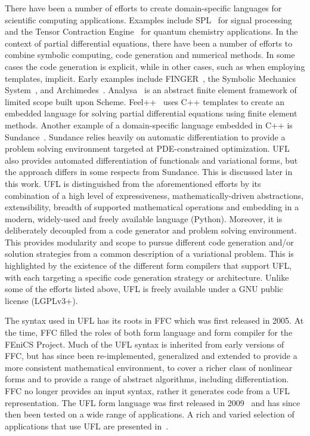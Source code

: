 \documentclass[prodmode,acmtoms]{acmsmall}
\begin{document}
There have been a number of efforts to create domain-specific
languages for scientific computing applications. Examples include
SPL~\citep{xiong:2001} for signal processing and the Tensor
Contraction Engine~\citep{baumgartner:2005} for quantum chemistry
applications.  In the context of partial differential equations, there
have been a number of efforts to combine symbolic computing, code
generation and numerical methods. In some cases the code generation is
explicit, while in other cases, such as when employing templates,
implicit. Early examples include FINGER~\citep{wang:1986}, the
Symbolic Mechanics System~\citep{korelc:1997}, and
Archimedes~\citep{ShewchukGhattas1993}. Analysa~\citep{bagheri:2004}
is an abstract finite element framework of limited scope built upon
Scheme.  Feel++~\citep{prudhomme:www,prudhomme:2006} uses C++
templates to create an embedded language for solving partial
differential equations using finite element methods. Another example
of a domain-specific language embedded in C++ is
Sundance~\citep{long:2010}. Sundance relies heavily on automatic
differentiation to provide a problem solving environment targeted at
PDE-constrained optimization. UFL also provides automated
differentiation of functionals and variational forms, but the approach
differs in some respects from Sundance. This is discussed later in
this work.  UFL is distinguished from the aforementioned efforts by
its combination of a high level of expressiveness,
mathematically-driven abstractions, extensibility, breadth of
supported mathematical operations and embedding in a modern,
widely-used and freely available language (Python). Moreover, it is
deliberately decoupled from a code generator and problem solving
environment. This provides modularity and scope to pursue different
code generation and/or solution strategies from a common description
of a variational problem. This is highlighted by the existence of the
different form compilers that support UFL, with each targeting a
specific code generation strategy or architecture. Unlike some of the
efforts listed above, UFL is freely available under a GNU public
license (LGPLv3+).

The syntax used in UFL has its roots in FFC which was first released
in 2005. At the time, FFC filled the roles of both form language and
form compiler for the FEniCS Project. Much of the UFL syntax is
inherited from early versions of FFC, but has since been
re-implemented, generalized and extended to provide a more consistent
mathematical environment, to cover a richer class of nonlinear forms
and to provide a range of abstract algorithms, including
differentiation. FFC no longer provides an input syntax, rather it
generates code from a UFL representation. The UFL form language was
first released in 2009~\citep{Alnaes2009} and has since then been
tested on a wide range of applications. A rich and varied selection of
applications that use UFL are presented in~\citet{fenics:book}.
\end{document}
